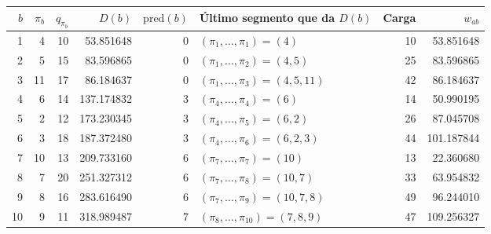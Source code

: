 \begin{tabular}{rrrrrlrr}\toprule
$b$ & $\pi_b$ & $q_{\pi_b}$ & $D(b)$ & $\mathrm{pred}(b)$ & Último segmento que da $D(b)$ & Carga & $w_{ab}$\\\midrule
1 & 4 & 10 & 53.851648 & 0 & $(\pi_{1},\dots,\pi_{1})=(4)$ & 10 & 53.851648\\
2 & 5 & 15 & 83.596865 & 0 & $(\pi_{1},\dots,\pi_{2})=(4, 5)$ & 25 & 83.596865\\
3 & 11 & 17 & 86.184637 & 0 & $(\pi_{1},\dots,\pi_{3})=(4, 5, 11)$ & 42 & 86.184637\\
4 & 6 & 14 & 137.174832 & 3 & $(\pi_{4},\dots,\pi_{4})=(6)$ & 14 & 50.990195\\
5 & 2 & 12 & 173.230345 & 3 & $(\pi_{4},\dots,\pi_{5})=(6, 2)$ & 26 & 87.045708\\
6 & 3 & 18 & 187.372480 & 3 & $(\pi_{4},\dots,\pi_{6})=(6, 2, 3)$ & 44 & 101.187844\\
7 & 10 & 13 & 209.733160 & 6 & $(\pi_{7},\dots,\pi_{7})=(10)$ & 13 & 22.360680\\
8 & 7 & 20 & 251.327312 & 6 & $(\pi_{7},\dots,\pi_{8})=(10, 7)$ & 33 & 63.954832\\
9 & 8 & 16 & 283.616490 & 6 & $(\pi_{7},\dots,\pi_{9})=(10, 7, 8)$ & 49 & 96.244010\\
10 & 9 & 11 & 318.989487 & 7 & $(\pi_{8},\dots,\pi_{10})=(7, 8, 9)$ & 47 & 109.256327\\
\bottomrule\end{tabular}

